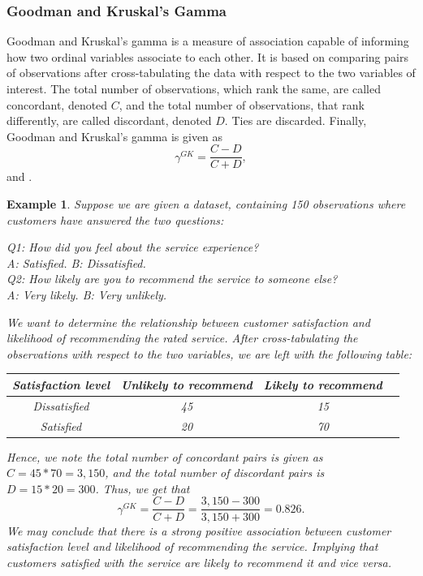 \documentclass[a4project,12pt]{article}
\theoremstyle{examplestyle}
\newtheorem{example}{Example}[section]
\theoremstyle{defstyle}
\theoremstyle{thmstyle}
\begin{document}
\subsubsection{Goodman and Kruskal's Gamma}
Goodman and Kruskal's gamma is a measure of association capable of informing how two ordinal variables associate to each other. It is based on comparing pairs of observations after cross-tabulating the data with respect to the two variables of interest. The total number of observations, which rank the same, are called concordant, denoted $C$, and the total number of observations, that rank differently, are called discordant, denoted $D$. Ties are discarded. Finally, Goodman and Kruskal's gamma is given as
\begin{equation}
    \gamma^{GK} = \frac{C-D}{C+D},
\end{equation}
\cite{Davis1967} and \cite{goodman-kruskal}.
\begin{mybox3}
\begin{example}
Suppose we are given a dataset, containing 150 observations where customers have answered the two questions:


    \begin{centering}
        Q1: How did you feel about the service experience? \\
        A: Satisfied. \qquad B: Dissatisfied. \\
        Q2: How likely are you to recommend the service to someone else?\\
        A: Very likely. \qquad B: Very unlikely. \\ 
    \end{centering}
We want to determine the relationship between customer satisfaction and likelihood of recommending the rated service. After cross-tabulating the observations with respect to the two variables, we are left with the following table:
    \begin{table}[H]
        \centering
        \begin{tabular}{|c|c|c|c|}
             \hline 
             Satisfaction level & Unlikely to recommend & Likely to recommend  \\
             \hline 
             Dissatisfied & 45 &  15 \\
             \hline
             Satisfied & 20 & 70 \\
             \hline 
        \end{tabular}
        \label{tab:ex1}
    \end{table}
    Hence, we note the total number of concordant pairs is given as $C=45*70 = 3,150$, and the total number of discordant pairs is $D=15*20 = 300$. Thus, we get that 
    \begin{equation*}
        \gamma^{GK}=\frac{C-D}{C+D} = \frac{3,150-300}{3,150+300} = 0.826.
    \end{equation*}
    We may conclude that there is a strong positive association between customer satisfaction level and likelihood of recommending the service. Implying that customers satisfied with the service are likely to recommend it and vice versa.
\end{example}    
\end{mybox3}
\end{document}
